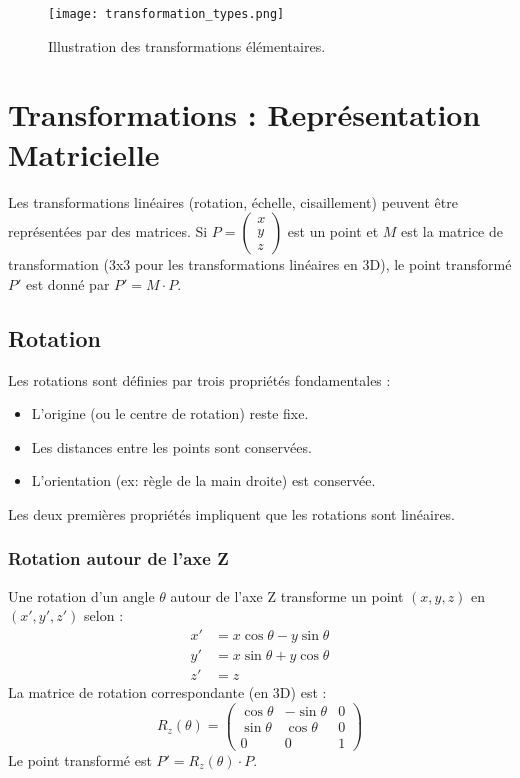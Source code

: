 \documentclass{article}
\begin{document}
\begin{figure}[H]
\centering
\texttt{[image: transformation\_types.png]}
\caption{Illustration des transformations élémentaires.}
\label{fig:trans_types}
\end{figure}

\section{Transformations : Représentation Matricielle}

Les transformations linéaires (rotation, échelle, cisaillement) peuvent être représentées par des matrices. Si $P = \begin{pmatrix} x \\ y \\ z \end{pmatrix}$ est un point et $M$ est la matrice de transformation (3x3 pour les transformations linéaires en 3D), le point transformé $P'$ est donné par $P' = M \cdot P$.

\subsection{Rotation}
Les rotations sont définies par trois propriétés fondamentales :
\begin{itemize}
    \item L'origine (ou le centre de rotation) reste fixe.
    \item Les distances entre les points sont conservées.
    \item L'orientation (ex: règle de la main droite) est conservée.
\end{itemize}
Les deux premières propriétés impliquent que les rotations sont linéaires.

\subsubsection{Rotation autour de l'axe Z}
Une rotation d'un angle $\theta$ autour de l'axe Z transforme un point $(x, y, z)$ en $(x', y', z')$ selon :
\begin{align*} x' &= x \cos \theta - y \sin \theta \\ y' &= x \sin \theta + y \cos \theta \\ z' &= z \end{align*}
La matrice de rotation correspondante (en 3D) est :
\[ R_z(\theta) = \begin{pmatrix} \cos \theta & -\sin \theta & 0 \\ \sin \theta & \cos \theta & 0 \\ 0 & 0 & 1 \end{pmatrix} \]
Le point transformé est $P' = R_z(\theta) \cdot P$.
\end{document}

